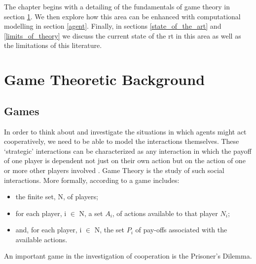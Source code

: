 \documentclass[11pt]{book}
\newcommand*{\np}{\par\noindent\newline}
\begin{document}
\np The chapter begins with a detailing of the fundamentals of game theory in section \ref{game_theoretic_background}.
We then explore how this area can be enhanced with computational modelling in section \ref{agent}.
Finally, in sections \ref{state_of_the_art} and \ref{limits_of_theory} we discuss the current state of the rt in this area as well as the limitations of this literature.

\section{Game Theoretic Background}\label{game_theoretic_background}
\subsection{Games}\label{games}
In order to think about and investigate the situations in which agents might act cooperatively, we need to be able to
model the interactions themselves. These `strategic' interactions can be characterized as any interaction in which the
payoff of one player is dependent not just on their own action but on the action of one or more other players involved \citep{angner_course_2012}. Game Theory is the study of such social interactions. More formally, according to
\citet{osborne_course_1994} a game includes:
\begin{itemize}
	\item the finite set, N, of players;
	\item for each player, i $\in$ N, a set $A_i$, of actions available to that
	player $N_i$;
	\item and, for each player, i $\in$ N, the set $P_i$ of pay-offs associated
	with the available actions.
\end{itemize}
An important game in the investigation of cooperation is the Prisoner's Dilemma. 
\end{document}
